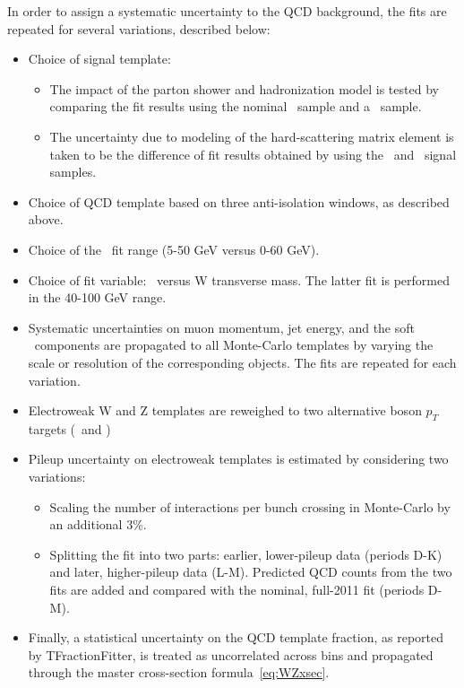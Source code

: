 In order to assign a systematic uncertainty to the QCD background, the fits are repeated for several variations, described below:

\begin{itemize}
\item Choice of signal template:
\begin{itemize}
\item The impact of the parton shower and hadronization model is tested by comparing the fit results using the nominal \Powheg\Pythia\ sample and a \Powheg\Herwig\ sample.
\item The uncertainty due to modeling of the hard-scattering matrix element is taken to be the difference of fit results obtained by using the \Powheg\Herwig\ and \Mcatnlo\ signal samples.
\end{itemize}
\item Choice of QCD template based on three anti-isolation windows, as described above.
\item Choice of the \MET\ fit range (5-50 GeV versus 0-60 GeV).
\item Choice of fit variable: \MET\ versus W transverse mass. The latter fit is performed in the 40-100 GeV range.
\item Systematic uncertainties on muon momentum, jet energy, and the soft \MET\ components are propagated to all Monte-Carlo \MET templates by varying the scale or resolution of the corresponding objects. The fits are repeated for each variation.
\item Electroweak W and Z templates are reweighed to two alternative boson $p_T$ targets (\Sherpa\ and \Powheg\Pythiaeight)
\item Pileup uncertainty on electroweak templates is estimated by considering two variations:
\begin{itemize}
\item Scaling the number of interactions per bunch crossing in Monte-Carlo by an additional 3\%.
\item Splitting the fit into two parts: earlier, lower-pileup data (periods D-K) and later, higher-pileup data (L-M). Predicted QCD counts from the two fits are added and compared with the nominal, full-2011 fit (periods D-M).
\end{itemize}
\item Finally, a statistical uncertainty on the QCD template fraction, as reported by TFractionFitter, is treated as uncorrelated across bins and propagated through the master cross-section formula~\ref{eq:WZxsec}.
\end{itemize}

